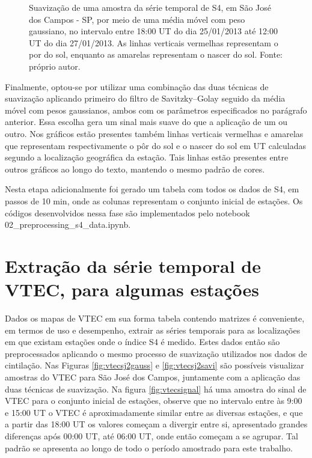 \begin{figure}[H]
\caption{Suavização de uma amostra da série temporal de S4, em São José dos Campos - SP, por meio de uma média móvel com peso gaussiano, no intervalo entre 18:00 UT do dia 25/01/2013 até 12:00 UT do dia 27/01/2013. As linhas verticais vermelhas representam o por do sol, enquanto as amarelas representam o nascer do sol. Fonte: próprio autor.}
\label{fig:gaussian}
\end{figure}

Finalmente, optou-se por utilizar uma combinação das duas técnicas de suavização aplicando primeiro do filtro de Savitzky–Golay seguido da média móvel com pesos gaussianos, ambos com os parâmetros especificados no parágrafo anterior. Essa escolha gera um sinal mais suave do que a aplicação de um ou outro. Nos gráficos estão presentes também linhas verticais vermelhas e amarelas que representam respectivamente o pôr do sol e o nascer do sol em UT calculadas segundo a localização geográfica da estação. Tais linhas estão presentes entre outros gráficos ao longo do texto, mantendo o mesmo padrão de cores.

Nesta etapa adicionalmente foi gerado um tabela com todos os dados de S4, em passos de 10 min, onde as colunas representam o conjunto inicial de estações. Os códigos desenvolvidos nessa fase são implementados pelo notebook 02\_preprocessing\_s4\_data.ipynb.

\section{Extração da série temporal de VTEC, para algumas estações}

Dados os mapas de VTEC em sua forma tabela contendo matrizes é conveniente, em termos de uso e desempenho, extrair as séries temporais para as localizações em que existam estações onde o índice S4 é medido. Estes dados então são preprocessados aplicando o mesmo processo de suavização utilizados nos dados de cintilação. Nas Figuras \ref{fig:vtecsj2gauss} e \ref{fig:vtecsj2savi} são possíveis visualizar amostras do VTEC para São José dos Campos, juntamente com a aplicação das duas técnicas de suavização. Na figura \ref{fig:vtecsignal} há uma amostra do sinal de VTEC para o conjunto inicial de estações, observe que no intervalo entre às 9:00 e 15:00 UT o VTEC é aproximadamente similar entre as diversas estações, e que a partir das 18:00 UT os valores começam a divergir entre si, apresentado grandes diferenças após 00:00 UT, até 06:00 UT, onde então começam a se agrupar. Tal padrão se apresenta ao longo de todo o período amostrado para este trabalho.
\vspace{-16pt}

